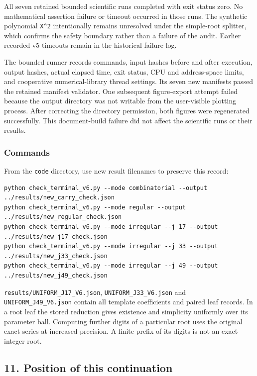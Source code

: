 \documentclass[11pt,letterpaper]{article}
\begin{document}
All seven retained bounded scientific runs completed with exit status zero. No mathematical assertion failure or timeout occurred in those runs. The synthetic polynomial \texttt{X\^{}2} intentionally remains unresolved under the simple-root splitter, which confirms the safety boundary rather than a failure of the audit. Earlier recorded v5 timeouts remain in the historical failure log.

The bounded runner records commands, input hashes before and after execution, output hashes, actual elapsed time, exit status, CPU and address-space limits, and cooperative numerical-library thread settings. Its seven new manifests passed the retained manifest validator. One subsequent figure-export attempt failed because the output directory was not writable from the user-visible plotting process. After correcting the directory permission, both figures were regenerated successfully. This document-build failure did not affect the scientific runs or their results.

\subsubsection{Commands}\label{commands}

From the \texttt{code} directory, use new result filenames to preserve this record:

\begin{verbatim}
python check_terminal_v6.py --mode combinatorial --output ../results/new_carry_check.json
python check_terminal_v6.py --mode regular --output ../results/new_regular_check.json
python check_terminal_v6.py --mode irregular --j 17 --output ../results/new_j17_check.json
python check_terminal_v6.py --mode irregular --j 33 --output ../results/new_j33_check.json
python check_terminal_v6.py --mode irregular --j 49 --output ../results/new_j49_check.json
\end{verbatim}

\texttt{results/UNIFORM\_J17\_V6.json}, \texttt{UNIFORM\_J33\_V6.json} and \texttt{UNIFORM\_J49\_V6.json} contain all template coefficients and paired leaf records. In a root leaf the stored reduction gives existence and simplicity uniformly over its parameter ball. Computing further digits of a particular root uses the original exact series at increased precision. A finite prefix of its digits is not an exact integer root.

\subsection{11. Position of this continuation}\label{position-of-this-continuation}
\end{document}
